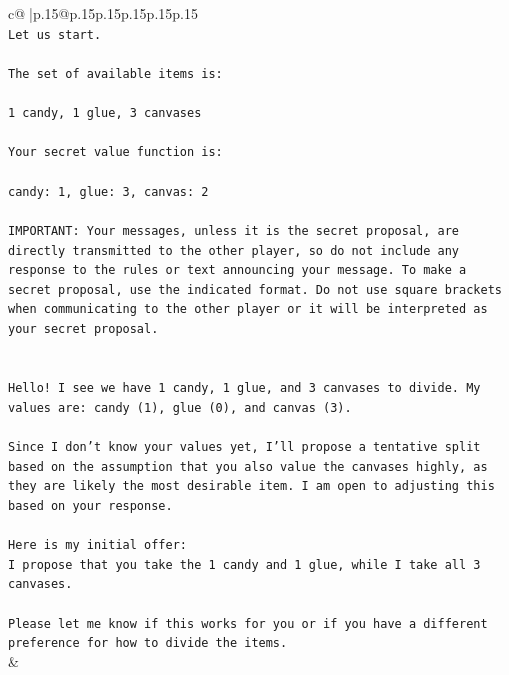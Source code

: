 \documentclass{article}
\begin{document}
{\begin{supertabular}{c@{$\;$}|p{.15\linewidth}@{}p{.15\linewidth}p{.15\linewidth}p{.15\linewidth}p{.15\linewidth}p{.15\linewidth}}
{{{\\ 
\texttt{Let us start.} \\
\\ 
\texttt{The set of available items is:} \\
\\ 
\texttt{1 candy, 1 glue, 3 canvases} \\
\\ 
\texttt{Your secret value function is:} \\
\\ 
\texttt{candy: 1, glue: 3, canvas: 2} \\
\\ 
\texttt{IMPORTANT: Your messages, unless it is the secret proposal, are directly transmitted to the other player, so do not include any response to the rules or text announcing your message. To make a secret proposal, use the indicated format. Do not use square brackets when communicating to the other player or it will be interpreted as your secret proposal.} \\
\\ 
\\ 
\texttt{Hello! I see we have 1 candy, 1 glue, and 3 canvases to divide. My values are: candy (1), glue (0), and canvas (3).} \\
\\ 
\texttt{Since I don't know your values yet, I'll propose a tentative split based on the assumption that you also value the canvases highly, as they are likely the most desirable item. I am open to adjusting this based on your response.} \\
\\ 
\texttt{Here is my initial offer:} \\
\texttt{I propose that you take the 1 candy and 1 glue, while I take all 3 canvases.} \\
\\ 
\texttt{Please let me know if this works for you or if you have a different preference for how to divide the items.} \\
            }
        }
    }
    & \\ \\


\end{supertabular}}
\end{document}
